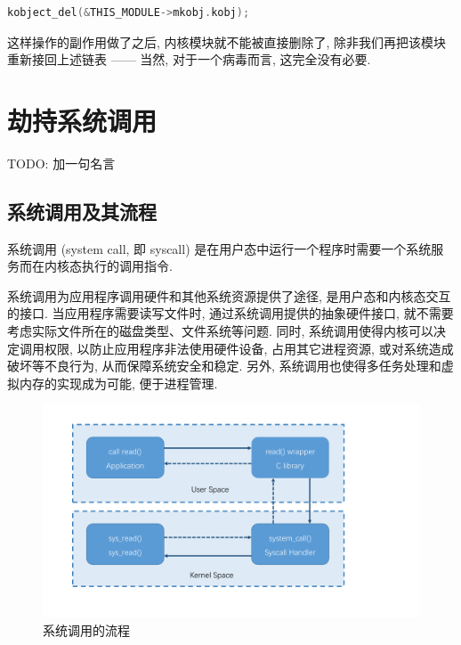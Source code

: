 \documentclass[11pt,fleqn]{book} %
\begin{document}
\vspace*{0.5cm}

\begin{lstlisting}[language=C]
kobject_del(&THIS_MODULE->mkobj.kobj);
\end{lstlisting}


\vspace*{0.5cm}



这样操作的副作用做了之后, 内核模块就不能被直接删除了, 除非我们再把该模块重新接回上述链表 —— 当然, 对于一个病毒而言, 这完全没有必要.
 

\newpage{}


\chapter{劫持系统调用}



TODO: 加一句名言

\newpage{}


\section{系统调用及其流程}



系统调用 (system call, 即 syscall) 是在用户态中运行一个程序时需要一个系统服务而在内核态执行的调用指令.

系统调用为应用程序调用硬件和其他系统资源提供了途径, 是用户态和内核态交互的接口. 当应用程序需要读写文件时, 通过系统调用提供的抽象硬件接口,
就不需要考虑实际文件所在的磁盘类型、文件系统等问题. 同时, 系统调用使得内核可以决定调用权限, 以防止应用程序非法使用硬件设备,
占用其它进程资源, 或对系统造成破坏等不良行为, 从而保障系统安全和稳定. 另外, 系统调用也使得多任务处理和虚拟内存的实现成为可能,
便于进程管理.

\begin{figure}[H]
\begin{centering}
\includegraphics[width=0.4\paperwidth]{image/syscall}
\par\end{centering}

\caption{系统调用的流程}


\end{figure}
\end{document}
